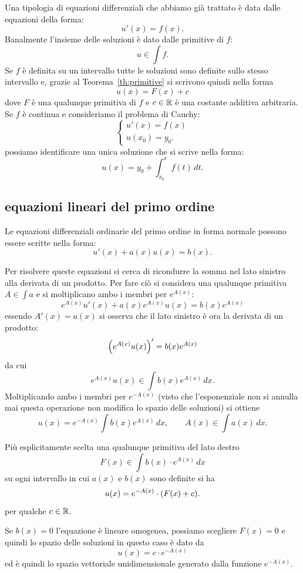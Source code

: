 Una tipologia di equazioni differenziali che abbiamo già trattato
è data dalle equazioni della forma:
\[
   u'(x) = f(x).
\]
Banalmente l'insieme delle soluzioni è dato dalle primitive di $f$:
\[
  u \in \int f.
\]
Se $f$ è definita su un intervallo tutte le soluzioni sono definite sullo stesso
intervallo e, grazie al Teorema~\ref{th:primitive}
si scrivono quindi nella forma
\[
  u(x) = F(x) + c
\]
dove $F$ è una qualunque primitiva di $f$ e $c\in {\mathbb R}$ è una costante additiva
arbitraria.
Se $f$ è continua e consideriamo il problema di Cauchy:
\[
  \begin{cases}
    u'(x) = f(x) \\
    u(x_0) = y_0.
  \end{cases}
\]
possiamo identificare una unica soluzione
che si scrive nella forma:
\[
  u(x) = y_0 + \int_{x_0}^x f(t)\, dt.
\]

\subsection{equazioni lineari del primo ordine}

Le equazioni differenziali ordinarie del primo
ordine in forma normale possono essere scritte nella forma:
\mymark{***}
\begin{equation}\label{eq:47744}
   u'(x) + a(x) u(x) = b(x).
\end{equation}

Per risolvere queste equazioni si cerca di ricondurre la somma
nel lato sinistro alla derivata di un prodotto.
Per fare ciò si considera una qualunque primitiva
$A\in \int a$ e si moltiplicano ambo i membri
per $e^{A(x)}$:
\[
  e^{A(x)} u'(x) + a(x) e^{A(x)} u(x) = b(x) e^{A(x)}
\]
essendo $A'(x) = a(x)$
si osserva che il lato sinistro è ora la derivata di un prodotto:
\[
  {\left( e^{A(x)}u(x) \right)}' = b(x) e^{A(x)}
\]
da cui
\[
  e^{A(x)} u(x) \in \int b(x) e^{A(x)}\, dx.
\]
Moltiplicando ambo i membri per $e^{-A(x)}$ (visto che l'esponenziale
non si annulla mai questa operazione non modifica lo spazio delle soluzioni)
si ottiene
\[
u(x) = e^{-A(x)} \int b(x) e^{A(x)}\, dx, \qquad
A(x) \in \int a(x)\, dx.
\]

Più esplicitamente
scelta una qualunque primitiva del lato destro
\[
  F(x) \in \int b(x) \cdot e^{A(x)}\, dx
\]
su ogni intervallo in cui $a(x)$ e $b(x)$ sono definite
si ha
\[
  u(x) = e^{-A(x)}\cdot {\left( F(x) + c \right)}.
\]
per qualche $c\in {\mathbb R}$.

Se $b(x)=0$ l'equazione è lineare omogenea, possiamo scegliere $F(x) = 0$
e quindi lo spazio delle soluzioni in questo caso
è dato da
\[
  u(x) = c \cdot e^{-A(x)}
\]
ed è quindi lo spazio vettoriale unidimensionale generato dalla funzione $e^{-A(x)}$.

